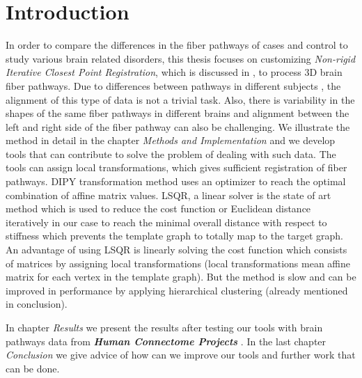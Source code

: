 \documentclass[../structure.tex]{subfiles}
\begin{document}
\chapter{Introduction}
In order to compare the differences in the fiber pathways of cases and control to study various brain related disorders, this thesis focuses on customizing \textit{Non-rigid Iterative Closest Point Registration}, which is discussed in \cite{Amberg2007}, to process 3D brain fiber pathways. Due to differences between pathways in different subjects , the alignment of this type of data is not a trivial task. Also, there is variability in the shapes of the same fiber pathways in different brains and alignment between the left and right side of the fiber pathway can also be challenging. We illustrate the method in detail in the chapter \textit{Methods and Implementation} and we develop tools that can contribute to solve the problem of dealing with such data. The tools can assign local transformations, which gives sufficient registration of fiber pathways. DIPY transformation method uses an optimizer to reach the optimal combination of affine matrix values.
LSQR, a linear solver is the state of art method which is used to reduce the cost function or Euclidean distance iteratively in our case to reach the minimal overall distance with respect to stiffness which prevents the template graph to totally map to the target graph.
An advantage of using LSQR is linearly solving the cost function which consists of matrices by assigning local transformations (local transformations mean affine matrix for each vertex in the template graph). But the method is slow and can be improved in performance by applying hierarchical clustering (already mentioned in conclusion).

In chapter \textit{Results} we present the results after testing our tools with 
brain pathways data from \textbf{\textit{Human Connectome Projects}} \cite{CCF}. In the last chapter \textit{Conclusion} we give advice of how can we improve our tools and further work that can be done.
\end{document}
